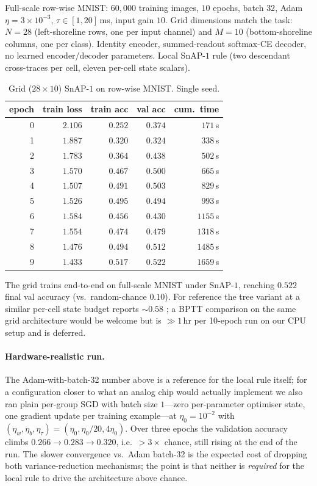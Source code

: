 \documentclass[11pt]{article}
\begin{document}
Full-scale row-wise MNIST: $60{,}000$ training images, $10$ epochs,
batch $32$, Adam $\eta{=}3{\times}10^{-3}$, $\tau\in[1, 20]$\,ms,
input gain $10$. Grid dimensions match the task: $N{=}28$
(left-shoreline rows, one per input channel) and $M{=}10$
(bottom-shoreline columns, one per class). Identity encoder,
summed-readout softmax-CE decoder, no learned encoder/decoder
parameters. Local SnAP-$1$ rule (two descendant cross-traces per
cell, eleven per-cell state scalars).

\begin{table}[h]
\centering
\caption{Grid ($28{\times}10$) SnAP-$1$ on row-wise MNIST.
Single seed.}
\label{tab:mnist}
\begin{tabular}{r r r r r}
\toprule
epoch & train loss & train acc & val acc & cum.\ time \\
\midrule
0 & $2.106$ & $0.252$ & $0.374$ & $171$\,s \\
1 & $1.887$ & $0.320$ & $0.324$ & $338$\,s \\
2 & $1.783$ & $0.364$ & $0.438$ & $502$\,s \\
3 & $1.570$ & $0.467$ & $0.500$ & $665$\,s \\
4 & $1.507$ & $0.491$ & $0.503$ & $829$\,s \\
5 & $1.526$ & $0.495$ & $0.494$ & $993$\,s \\
6 & $1.584$ & $0.456$ & $0.430$ & $1155$\,s \\
7 & $1.554$ & $0.474$ & $0.479$ & $1318$\,s \\
8 & $1.476$ & $0.494$ & $0.512$ & $1485$\,s \\
9 & $1.433$ & $0.517$ & $\mathbf{0.522}$ & $1659$\,s \\
\bottomrule
\end{tabular}
\end{table}

The grid trains end-to-end on full-scale MNIST under SnAP-$1$, reaching
$0.522$ final val accuracy (vs.\ random-chance $0.10$). For reference
the tree variant at a similar per-cell state budget reports
$\sim\!0.58$ \cite{tree-neurons}; a BPTT comparison on the same grid
architecture would be welcome but is $\gg 1$\,hr per 10-epoch run on
our CPU setup and is deferred.

\paragraph{Hardware-realistic run.}
The Adam-with-batch-32 number above is a reference for the local rule
itself; for a configuration closer to what an analog chip would
actually implement we also ran plain per-group SGD with batch size
$1$---zero per-parameter optimiser state, one gradient update per
training example---at $\eta_0{=}10^{-2}$ with
$(\eta_w, \eta_b, \eta_\tau)=(\eta_0, \eta_0/20, 4\eta_0)$. Over
three epochs the validation accuracy climbs
$0.266 \to 0.283 \to 0.320$, i.e.\ $>3\times$ chance, still rising at
the end of the run. The slower convergence vs.\ Adam batch-32 is the
expected cost of dropping both variance-reduction mechanisms; the
point is that neither is \emph{required} for the local rule to drive
the architecture above chance.
\end{document}
